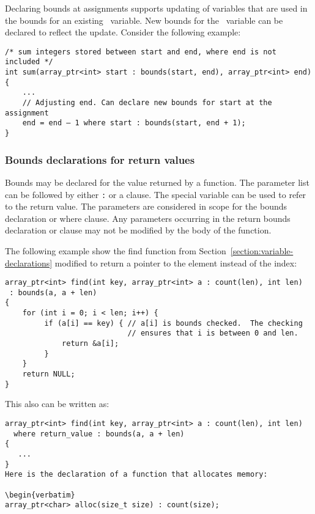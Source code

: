Declaring bounds at assignments supports updating of variables that are
used in the bounds for an existing \arrayptr\ variable. New
bounds for the \arrayptr\ variable can be declared to reflect
the update. Consider the following example:

\begin{verbatim}
/* sum integers stored between start and end, where end is not included */
int sum(array_ptr<int> start : bounds(start, end), array_ptr<int> end)
{ 
    ...
    // Adjusting end. Can declare new bounds for start at the assignment
    end = end – 1 where start : bounds(start, end + 1);
}
\end{verbatim}

\subsubsection{Bounds declarations for return values}

Bounds may be declared for the value returned by a function. The
parameter list can be followed by either \texttt{:}  or
a  clause. The special variable  can
be used to refer to the return value. The parameters are considered in
scope for the bounds declaration or where clause. Any parameters
occurring in the return bounds declaration or  clause may
not be modified by the body of the function.

The following example show the find function from
Section~\ref{section:variable-declarations} modified
to return a pointer to the element instead of the index:

\begin{verbatim}
array_ptr<int> find(int key, array_ptr<int> a : count(len), int len)
 : bounds(a, a + len)
{
    for (int i = 0; i < len; i++) {
         if (a[i] == key) { // a[i] is bounds checked.  The checking
                            // ensures that i is between 0 and len.
             return &a[i];
         }
    }
    return NULL;
}
\end{verbatim}

This also can be written as:

\begin{verbatim}
array_ptr<int> find(int key, array_ptr<int> a : count(len), int len)
  where return_value : bounds(a, a + len)
{
   ...
}
Here is the declaration of a function that allocates memory:

\begin{verbatim}
array_ptr<char> alloc(size_t size) : count(size);
\end{verbatim}

